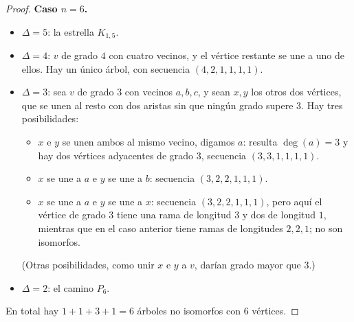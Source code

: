 \begin{proof}
    \textbf{Caso \( n = 6 \).}
    \begin{itemize}
        \item \( \Delta = 5 \): la estrella \( K_{1,5} \).
        \item \( \Delta = 4 \): \( v \) de grado \( 4 \) con cuatro vecinos, y el vértice restante se une a uno de ellos. Hay un único árbol, con secuencia \( (4,2,1,1,1,1) \).
        \item \( \Delta = 3 \): sea \( v \) de grado \( 3 \) con vecinos \( a, b, c \), y sean \( x, y \) los otros dos vértices, que se unen al resto con dos aristas sin que ningún grado supere \( 3 \). Hay tres posibilidades:
              \begin{itemize}
                  \item \( x \) e \( y \) se unen ambos al mismo vecino, digamos \( a \): resulta \( \deg(a) = 3 \) y hay dos vértices adyacentes de grado \( 3 \), secuencia \( (3,3,1,1,1,1) \).
                  \item \( x \) se une a \( a \) e \( y \) se une a \( b \): secuencia \( (3,2,2,1,1,1) \).
                  \item \( x \) se une a \( a \) e \( y \) se une a \( x \): secuencia \( (3,2,2,1,1,1) \), pero aquí el vértice de grado \( 3 \) tiene una rama de longitud \( 3 \) y dos de longitud \( 1 \), mientras que en el caso anterior tiene ramas de longitudes \( 2, 2, 1 \); no son isomorfos.
              \end{itemize}
              (Otras posibilidades, como unir \( x \) e \( y \) a \( v \), darían grado mayor que \( 3 \).)
        \item \( \Delta = 2 \): el camino \( P_6 \).
    \end{itemize}
    En total hay \( 1 + 1 + 3 + 1 = 6 \) árboles no isomorfos con \( 6 \) vértices.
\end{proof}

\vspace{0.5cm}

